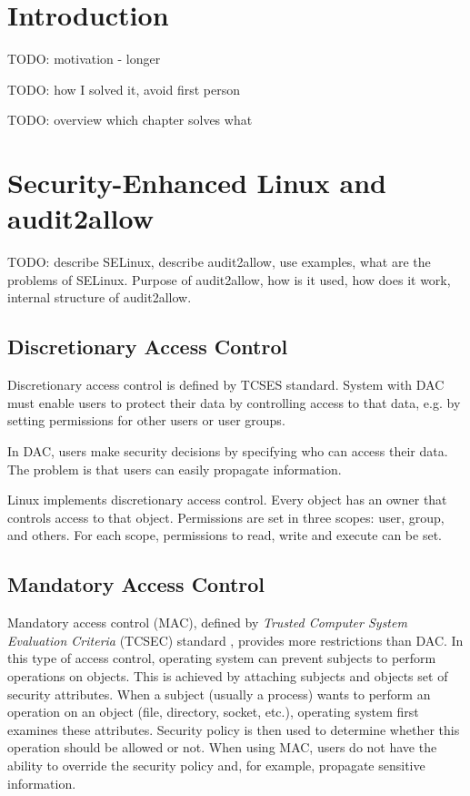 \chapter{Introduction}
TODO: motivation - longer

TODO: how I solved it, avoid first person

TODO: overview which chapter solves what

\chapter{Security-Enhanced Linux and audit2allow}
TODO: describe SELinux, describe audit2allow, use examples, what are the
problems of SELinux. Purpose of audit2allow, how is it used, how does it work,
internal structure of audit2allow.

\section{Discretionary Access Control}
Discretionary access control is defined by TCSES standard. System with DAC must
enable users to protect their data by controlling access to that data, e.g. by
setting permissions for other users or user groups.

In DAC, users make security decisions by specifying who can access their data.
The problem is that users can easily propagate information.

Linux implements discretionary access control. Every object has an owner that
controls access to that object. Permissions are set in three scopes: user,
group, and others. For each scope, permissions to read, write and execute can be
set.

\section{Mandatory Access Control}
Mandatory access control (MAC), defined by \emph{Trusted Computer System
Evaluation Criteria} (TCSEC) standard \cite{orangebook}, provides more
restrictions than DAC. In this type of access control, operating system can
prevent subjects to perform operations on objects. This is achieved by attaching
subjects and objects set of security attributes. When a subject (usually a
process) wants to perform an operation on an object (file, directory, socket,
etc.), operating system first examines these attributes. Security policy is then
used to determine whether this operation should be allowed or not. When using
MAC, users do not have the ability to override the security policy and, for
example, propagate sensitive information.

